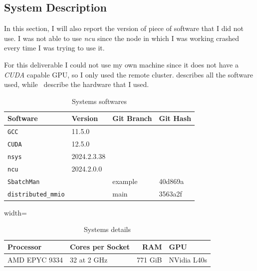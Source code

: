 \documentclass[conference]{IEEEtran}
\begin{document}

\subsection{System Description}\label{sec:system-description}


In this section, I will also report the version of piece of software that I did not use. I was not able to use \emph{ncu} since the node in which I was working crashed every time I was trying to use it.

For this deliverable I could not use my own machine since it does not have a \emph{CUDA} capable GPU, so I only used the remote cluster.  describes all the software used, while~ describe the hardware that I used.

\begin{table}[ht]
    \centering
    \begin{tabular}{llll}
      \toprule
      \textbf{Software} & \textbf{Version} & \textbf{Git Branch} & \textbf{Git Hash}\\
      \midrule
      \texttt{GCC} & 11.5.0 & & \\
      \texttt{CUDA} & 12.5.0 & & \\
      \texttt{nsys} & 2024.2.3.38 & & \\
      \texttt{ncu} & 2024.2.0.0 & & \\
      \texttt{SbatchMan} & & example & 40d869a\\
      \texttt{distributed\_mmio} & & main & 3563a2f\\
      \bottomrule
    \end{tabular}
    \vspace{.5em}
    
    \caption{Systems softwares}
    \label{tab:system-softwares}
\end{table}

\begin{table}[ht]
    \centering
    \begin{adjustbox}{width=\columnwidth}
    \begin{tabular}{llrl}
    \toprule
    \textbf{Processor} & \textbf{Cores per Socket} & \textbf{RAM} & \textbf{GPU} \\
    \midrule
    AMD EPYC 9334 & 32 at 2 GHz & 771 GiB & NVidia L40s\\
    \bottomrule
    \end{tabular}
    \end{adjustbox}
    \vspace{.5em}
    
    \caption{Systems details}
    \label{tab:system-detals}
\end{table}
\end{document}

